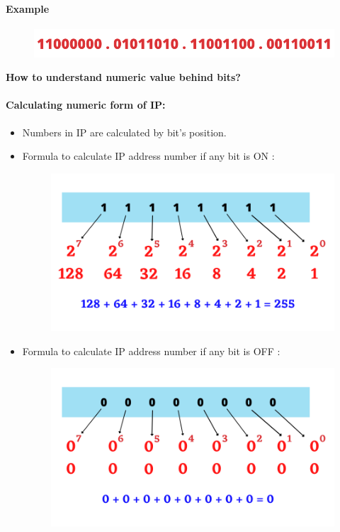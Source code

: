 \begin{flushleft}
\paragraph{Example}
\begin{figure}[h!]
	\centering
	\includegraphics[scale=0.6]{content/chapter14/images/ip2.png}
\end{figure}
\textbf{How to understand numeric value behind bits?}

\newpage

\paragraph{Calculating numeric form of IP:}
\begin{itemize}
	\item Numbers in IP are calculated by bit's position.
	\item Formula to calculate IP address number if any bit is \color{blue} ON \color{black}:
	\begin{figure}[h!]
		\centering
		\includegraphics[scale=0.5]{content/chapter14/images/ip3.png}
	\end{figure}
	\item Formula to calculate IP address number if any bit is \color{red} OFF \color{black}:
	\begin{figure}[h!]
		\centering
		\includegraphics[scale=0.5]{content/chapter14/images/ip4.png}
	\end{figure}


\end{itemize}
\end{flushleft}
